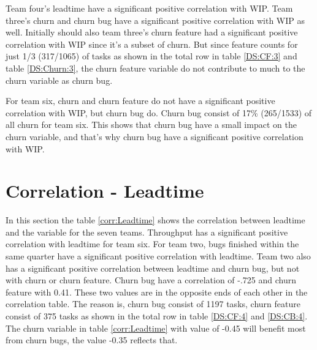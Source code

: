 \documentclass[UKenglish]{ifimaster}  %
\begin{document}
Team four's leadtime have a significant positive correlation with WIP.  Team three's churn and churn bug have a significant positive correlation with WIP as well.  Initially should also team three's churn feature had a significant positive correlation with WIP since it's a subset of churn.  But since feature counts for just 1/3 (317/1065) of tasks as shown in the total row in table \ref{DS:CF:3} and table \ref{DS:Churn:3}, the churn feature variable do not contribute to much to the churn variable as churn bug.

For team six, churn and churn feature do not have a significant positive correlation with WIP, but churn bug do. Churn bug consist of 17\% (265/1533) of all churn for team six. This shows that churn bug have a small impact on the churn variable, and that's why churn bug have a significant positive correlation with WIP.


\section{Correlation - Leadtime}
\label{sec:corr:lt}
In this section the table \ref{corr:Leadtime} shows the correlation between leadtime and the variable for the seven teams.  Throughput has a significant positive correlation with leadtime for team six.  For team two, bugs finished within the same quarter have a significant positive correlation with leadtime.  Team two also has a significant positive correlation between leadtime and churn bug, but not with churn or churn feature. Churn bug have a correlation of -.725 and churn feature with 0.41. These two values are in the opposite ends of each other in the correlation table. The reason is, churn bug consist of 1197 tasks, churn feature consist of 375 tasks as shown in the total row in table \ref{DS:CF:4} and \ref{DS:CB:4}.  The churn variable in table \ref{corr:Leadtime} with value of -0.45 will benefit most from churn bugs, the value -0.35 reflects that.
\end{document}

